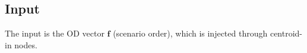\subsection{Input}

The input is the OD vector $\bm{f}$ (scenario order), which is injected through centroid-in nodes.

